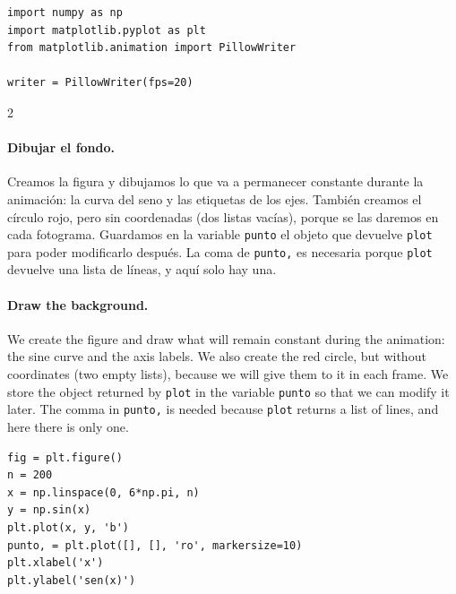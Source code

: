 \begin{verbatim}
import numpy as np
import matplotlib.pyplot as plt
from matplotlib.animation import PillowWriter

writer = PillowWriter(fps=20)
\end{verbatim}
\begin{paracol}{2}
\paragraph{Dibujar el fondo.} Creamos la figura y dibujamos lo que va a permanecer constante durante la animación: la curva del seno y las etiquetas de los ejes. También creamos el círculo rojo, pero sin coordenadas (dos listas vacías), porque se las daremos en cada fotograma. Guardamos en la variable \texttt{punto} el objeto que devuelve \texttt{plot} para poder modificarlo después. La coma de \texttt{punto,} es necesaria porque \texttt{plot} devuelve una lista de líneas, y aquí solo hay una.
\switchcolumn
\paragraph{Draw the background.} We create the figure and draw what will remain constant during the animation: the sine curve and the axis labels. We also create the red circle, but without coordinates (two empty lists), because we will give them to it in each frame. We store the object returned by \texttt{plot} in the variable \texttt{punto} so that we can modify it later. The comma in \texttt{punto,} is needed because \texttt{plot} returns a list of lines, and here there is only one.
\end{paracol}
\begin{verbatim}
fig = plt.figure()
n = 200
x = np.linspace(0, 6*np.pi, n)
y = np.sin(x)
plt.plot(x, y, 'b')
punto, = plt.plot([], [], 'ro', markersize=10)
plt.xlabel('x')
plt.ylabel('sen(x)')
\end{verbatim}
